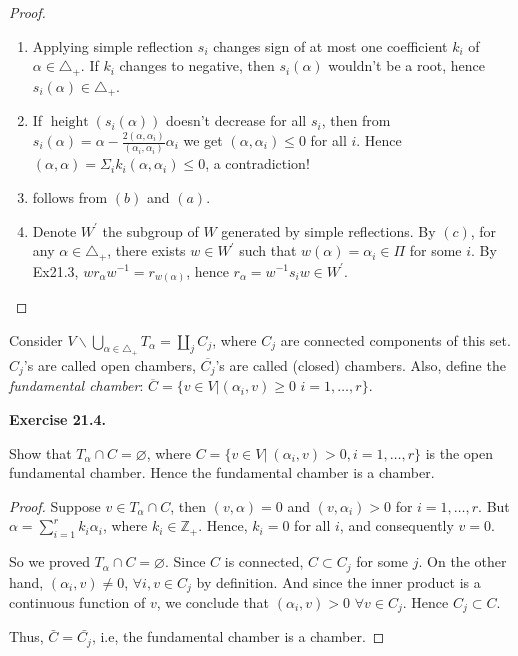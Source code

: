 \documentclass[10pt,twoside]{article}
\newcommand{\Zz}{\mathbb Z}
\theoremstyle{definition}
\theoremstyle{remark}
\newcommand{\exercise}[1]{
	\vspace{9pt}\noindent
	{\bf Exercise #1.}
}
\begin{document}
\begin{proof}\ 
\renewcommand{\labelenumi}{(\alph{enumi})}
\begin{enumerate}
\item Applying simple reflection $s_{i}$ changes sign of at
most one coefficient $k_{i}$ of $\alpha\in\triangle_{+}$. If
$k_{i}$ changes to negative, then $s_{i}(\alpha)$ wouldn't be a root,
hence
$s_{i}(\alpha)\in \triangle_{+}$.

\item If $\operatorname{height}(s_{i}(\alpha))$ doesn't decrease for all
$s_{i}$, then from
$s_{i}(\alpha)=\alpha-\frac{2(\alpha,\alpha_{i})}{(\alpha_{i},\alpha_{i})}\alpha_{i}$
we get $(\alpha,\alpha_{i})\leq0$ for all $i$. Hence
$(\alpha,\alpha)=\Sigma_{i}k_{i}(\alpha,\alpha_{i})\leq0$, a contradiction! 

\item follows from $(b)$ and $(a)$.

\item Denote $W^{'}$ the subgroup of $W$ generated
by simple reflections. By $(c)$, for any $\alpha\in\triangle_{+}$,
there exists $w\in W^{'}$ such that $w(\alpha)=\alpha_{i}\in \Pi$
for some $i$. By Ex21.3,
$wr_{\alpha}w^{-1}=r_{w(\alpha)}$, hence
$r_{\alpha}=w^{-1}s_{i}w \in W^{'}$.

\end{enumerate}
\end{proof}


Consider $V\backslash
\bigcup_{\alpha\in\triangle_{+}}T_{\alpha}=\coprod_{j}C_{j}$,
where $C_{j}$ are connected components of this set. $C_{j}$'s are
called open chambers, $\overline{C_{j}}$'s are called (closed)
chambers. Also, define the {\em fundamental chamber}: $\overline{C}=\{v\in
V|(\alpha_{i},v)\geq 0$ $i=1,\ldots,r\}$.

\exercise{21.4}
Show that $T_\alpha \cap C=\varnothing$, where $C=\{ v\in V | \ (\alpha_i, v)>0, i=1,\dotsc,r\}$ is the open fundamental chamber.  Hence the fundamental chamber is a chamber.

\begin{proof}
Suppose $v\in T_\alpha \cap C$, then $(v,\alpha)=0$ and $(v,\alpha_i)>0$ for $i= 1,\dotsc, r$.  But $\alpha=\sum_{i=1}^{r} k_i\alpha_i$, where $k_i\in \Zz_+$.  Hence, $k_i=0$ for all $i$, and consequently $v=0$.

So we proved $T_\alpha \cap C=\varnothing$.  Since $C$ is connected, $C \subset C_j$ for some $j$.  On the other hand, $(\alpha_i,v)\neq 0$, $\forall i, v\in C_j$ by definition.  And since the inner product is a continuous function of $v$, we conclude that $(\alpha_i, v)>0$ $\forall v\in C_j$.  Hence $C_j\subset C$.

Thus, $\bar{C}=\bar{C_j}$, i.e, the fundamental chamber is a chamber.

\end{proof}
\end{document}
